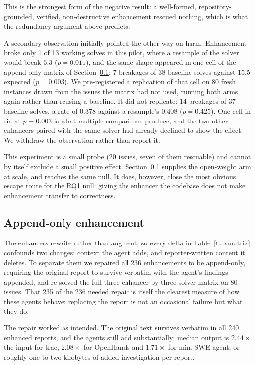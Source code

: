 \documentclass[journal]{IEEEtran}
\begin{document}
This is the strongest form of the negative result: a well-formed, repository-grounded, verified, non-destructive enhancement rescued nothing, which is what the redundancy argument above predicts.

A secondary observation initially pointed the other way on harm. Enhancement broke only 1 of 13 working solves in this pilot, where a resample of the solver would break $5.3$ ($p = 0.011$), and the same shape appeared in one cell of the append-only matrix of Section~\ref{sec:appendonly}: 7 breakages of 38 baseline solves against 15.5 expected ($p = 0.003$). We pre-registered a replication of that cell on 80 fresh instances drawn from the issues the matrix had not used, running both arms again rather than reusing a baseline. It did not replicate: 14 breakages of 37 baseline solves, a rate of 0.378 against a resample's 0.408 ($p = 0.425$). One cell in six at $p = 0.003$ is what multiple comparisons produce, and the two other enhancers paired with the same solver had already declined to show the effect. We withdraw the observation rather than report it.

This experiment is a small probe (20 issues, seven of them rescuable) and cannot by itself exclude a small positive effect. Section~\ref{sec:appendonly} supplies the open-weight arm at scale, and reaches the same null. It does, however, close the most obvious escape route for the RQ1 null: giving the enhancer the codebase does not make enhancement transfer to correctness.

\subsection{Append-only enhancement}
\label{sec:appendonly}
The enhancers rewrite rather than augment, so every delta in Table~\ref{tab:matrix} confounds two changes: context the agent adds, and reporter-written content it deletes. To separate them we repaired all 236 enhancements to be append-only, requiring the original report to survive verbatim with the agent's findings appended, and re-solved the full three-enhancer by three-solver matrix on 80 issues. That 235 of the 236 needed repair is itself the clearest measure of how these agents behave: replacing the report is not an occasional failure but what they do.

The repair worked as intended. The original text survives verbatim in all 240 enhanced reports, and the agents still add substantially: median output is $2.44\times$ the input for trae, $2.08\times$ for OpenHands and $1.71\times$ for mini-SWE-agent, or roughly one to two kilobytes of added investigation per report.
\end{document}
